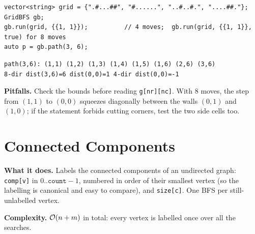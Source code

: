 \begin{lstlisting}[style=snippet]
vector<string> grid = {".#...##", "#......", "..#..#.", "....##."};
GridBFS gb;
gb.run(grid, {{1, 1}});          // 4 moves;  gb.run(grid, {{1, 1}}, true) for 8 moves
auto p = gb.path(3, 6);
\end{lstlisting}
\begin{lstlisting}[style=trace]
path(3,6): (1,1) (1,2) (1,3) (1,4) (1,5) (1,6) (2,6) (3,6)
8-dir dist(3,6)=6 dist(0,0)=1 4-dir dist(0,0)=-1
\end{lstlisting}

\textbf{Pitfalls.} Check the bounds before reading \texttt{g[nr][nc]}. With 8 moves, the step from $(1,1)$ to $(0,0)$ squeezes diagonally between the walls $(0,1)$ and $(1,0)$; if the statement forbids cutting corners, test the two side cells too.



\clneed
\section{Connected Components}
\label{sec:cl-components}

\textbf{What it does.} Labels the connected components of an undirected graph: \texttt{comp[v]} in $0..\texttt{count}-1$, numbered in order of their smallest vertex (so the labelling is canonical and easy to compare), and \texttt{size[c]}. One BFS per still-unlabelled vertex.

\textbf{Complexity.} $\mathcal{O}(n+m)$ in total: every vertex is labelled once over all the searches.

\begin{diagrambox}
\end{diagrambox}

